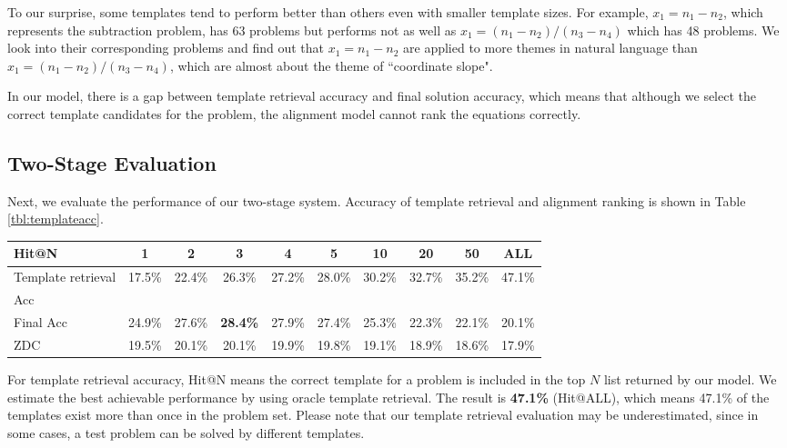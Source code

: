 \documentclass[11pt,letterpaper]{article}
\begin{document}
To our surprise, some templates tend to perform better than others even with smaller template sizes. For example, $x_{1}=n_{1}-n_{2}$, which represents the subtraction problem, has 63 problems but performs not as well as $x_{1}=(n_{1}-n_{2})/(n_{3}-n_{4})$ which has 48 problems. We look into their corresponding problems and find out that $x_{1}=n_{1}-n_{2}$ are applied to more themes in natural language than $x_{1}=(n_{1}-n_{2})/(n_{3}-n_{4})$, which are almost about the theme of ``coordinate slope".

In our model, there is a gap between template retrieval accuracy and final solution accuracy, which means that although we select the correct template candidates for the problem, the alignment model cannot rank the equations correctly.

\subsection{Two-Stage Evaluation}
Next, we evaluate the performance of our two-stage system. Accuracy of template retrieval and alignment ranking is shown in Table \ref{tbl:templateacc}.

\begin{table*}[htb]
\begin{center}
	\begin{tabular}{l|c|c|c|c|c|c|c|c|c}
        \hline
		Hit@N & 1 & 2 & 3 & 4 & 5 & 10 & 20 & 50 & ALL\\
        \hline
		Template retrieval & 17.5\% & 22.4\% & 26.3\% & 27.2\% & 28.0\% & 30.2\% & 32.7\% & 35.2\% & 47.1\%\\
            Acc            &&&&&&&&&\\
        \hline
        Final Acc & 24.9\% & 27.6\% & \textbf{28.4\%} & 27.9\% & 27.4\% & 25.3\% & 22.3\% & 22.1\% & 20.1\%\\
        \hline
        \hline
        ZDC & 19.5\% & 20.1\% & 20.1\% & 19.9\% & 19.8\% & 19.1\% & 18.9\% & 18.6\% & 17.9\%\\
        \hline
	\end{tabular}
\end{center}
	\caption{Results of template retrieval and final accuracy with different top $N$ templates retrieved.}\label{tbl:templateacc}
\end{table*}

For template retrieval accuracy, Hit@N means the correct template for a problem is included in the top $N$ list returned by our model. We estimate the best achievable performance by using oracle template retrieval. The result is \textbf{47.1\%} (Hit@ALL), which means 47.1\% of the templates exist more than once in the problem set. Please note that our template retrieval evaluation may be underestimated, since in some cases, a test problem can be solved by different templates.
\end{document}
